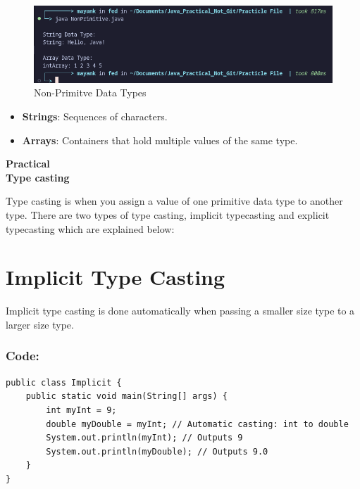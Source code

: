 \documentclass[a4paper,12pt]{article}
\newcounter{practicalno} %
\newcommand{\practicaltitle}[1]{
    \stepcounter{practicalno} %
    \newpage
    \begin{center}
        \vspace{1cm}
        \Large\textbf{Practical \thepracticalno} \\
        \vspace{0.5cm}
        \Large\textbf{#1} %
        \normalsize\vspace{1cm}
    \end{center}
}
\begin{document}
\begin{figure}[H]
    \centering
    \includegraphics[width=0.9\linewidth]{images/NonPrimData.png}
    \caption{Non-Primitve Data Types}
    \label{fig:sample_image}
\end{figure}

\begin{itemize}[leftmargin=2cm]
    \item \textbf{Strings}: Sequences of characters.
    \item \textbf{Arrays}: Containers that hold multiple values of the same type.
\end{itemize}

\setcounter{section}{0}

\practicaltitle{Type casting}
Type casting is when you assign a value of one primitive data type to another type. There are two types of type casting, implicit typecasting and explicit typecasting which are explained below:

\section{Implicit Type Casting}
Implicit type casting is done automatically when passing a smaller size type to a larger size type.
\begin{center}
\end{center}
\subsubsection{Code: }
\begin{lstlisting}
public class Implicit {
    public static void main(String[] args) {
        int myInt = 9;
        double myDouble = myInt; // Automatic casting: int to double
        System.out.println(myInt); // Outputs 9
        System.out.println(myDouble); // Outputs 9.0
    }
}    
\end{lstlisting}
\end{document}
